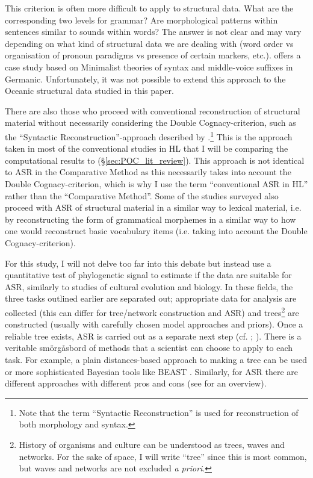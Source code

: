 \documentclass[12pt,letterpaper]{article}
\begin{document}
This criterion is often more difficult to apply to structural data. What are the corresponding two levels for grammar? Are morphological patterns within sentences similar to sounds within words? The answer is not clear and may vary depending on what kind of structural data we are dealing with (word order vs organisation of pronoun paradigms vs presence of certain markers, etc.). \citet{walkden_2013} offers a case study based on Minimalist theories of syntax and middle-voice suffixes in Germanic. Unfortunately, it was not possible to extend this approach to the Oceanic structural data studied in this paper.

There are also those who proceed with conventional reconstruction of structural material without necessarily considering the Double Cognacy-criterion, such as the ``Syntactic Reconstruction''-approach described by \citet[17]{clark1973aspects}.\footnote{Note that the term ``Syntactic Reconstruction'' is used for reconstruction of both morphology and syntax.} This is the approach taken in most of the conventional studies in HL that I will be comparing the computational results to (§\ref{sec:POC_lit_review}). This approach is not identical to ASR in the Comparative Method as this necessarily takes into account the Double Cognacy-criterion, which is why I use the term ``conventional ASR in HL'' rather than the ``Comparative Method''. Some of the studies surveyed also proceed with ASR of structural material in a similar way to lexical material, i.e. by reconstructing the form of grammatical morphemes in a similar way to how one would reconstruct basic vocabulary items (i.e. taking into account the Double Cognacy-criterion).  

For this study, I will not delve too far into this debate but instead use a quantitative test of phylogenetic signal to estimate if the data are suitable for ASR, similarly to studies of cultural evolution and biology. In these fields, the three tasks outlined earlier are separated out; appropriate data for analysis are collected (this can differ for tree/network construction and ASR) and trees\footnote{History of organisms and culture can be understood as trees, waves and networks. For the sake of space, I will write ``tree'' since this is most common, but waves and networks are not excluded \textit{a priori}.} are constructed (usually with carefully chosen model approaches and priors). Once a reliable tree exists, ASR is carried out as a separate next step (cf. \citealt{holland2020accuracy}; \citealt{evans2021uses}). There is a veritable smörgåsbord of methods that a scientist can choose to apply to each task. For example, a plain distances-based approach to making a tree can be used \citep{jager2016inferring} or more sophisticated Bayesian tools like BEAST \citep{drummond2015bayesian}. Similarly, for ASR there are different approaches with different pros and cons (see \citealt{joy2016ancestral} for an overview). 
\end{document}
